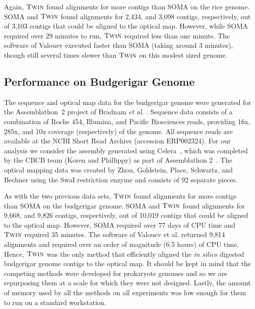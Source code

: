 Again, $\mbox{\rm {\sc Twin}}$ found alignments for more contigs than SOMA on the rice genome.  SOMA and $\mbox{\rm {\sc Twin}}$ found alignments for 2,434, and 3,098 contigs, respectively, out of 3,103 contigs that could be aligned to the optical map.  However, while SOMA required over 29 minutes to run, $\mbox{\rm {\sc Twin}}$ required less than one minute. 
The software of Valouev executed faster than SOMA (taking around 3 minutes), though still several times slower than $\mbox{\rm {\sc Twin}}$ on this modest sized genome.


\subsection{Performance on Budgerigar Genome} \label{section:parrot}

The sequence and optical map data for the budgerigar genome were generated for the Assemblathon~2 project of Bradnam {\em et al.} \cite{bradnam2013assemblathon}.   Sequence data consists of  a combination of Roche 454, Illumina, and Pacific Biosciences reads, providing 16x, 285x, and 10x coverage (respectively) of the genome.  All sequence reads are available at the NCBI Short Read Archive (accession  ERP002324).  For our analysis we consider the assembly generated using Celera~\cite{celera}, which was completed by the CBCB team (Koren and Phillippy) as part of  Assemblathon 2~\cite{bradnam2013assemblathon}.  The optical mapping data was created by Zhou, Goldstein, Place, Schwartz, and Bechner using the SwaI restriction enzyme and consists of 92 separate pieces. %

As with the two previous data sets, $\mbox{\rm {\sc Twin}}$ found alignments for more contigs than SOMA on the budgerigar genome.  SOMA and $\mbox{\rm {\sc Twin}}$ found alignments for 9,668, and 9,826 contigs, respectively, out of 10,019 contigs that could be aligned to the optical map.  However,  SOMA required over 77 days of CPU time and $\mbox{\rm {\sc Twin}}$ required 35 minutes.  The software of Valouev et al. returned 9,814 alignments and required over an order of magnitude (6.5 hours) of CPU time.  Hence, $\mbox{\rm {\sc Twin}}$ was the only method that efficiently aligned the {\em in silico} digested budgerigar genome contigs to the optical map.  It should be kept in mind that the competing methods were developed for prokaryote genomes and so we are repurposing them at a scale for which they were not designed.   Lastly, the amount of memory used by all the methods on all experiments was low enough for them to run on a standard workstation.  

